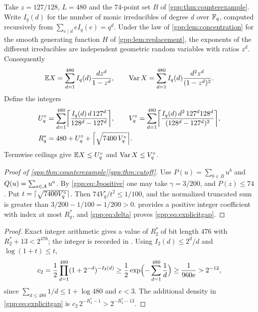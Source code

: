 Take $z=127/128$, $L=480$ and the $74$-point set $B$ of \cref{gpp:thm:counterexample}.
Write $I_q(d)$ for the number of monic irreducibles of degree $d$ over $\mathbb{F}_q$, computed
recursively from $\sum_{e\mid d}eI_q(e)=q^d$. Under the law of
\cref{gpp:lem:concentration} for the smooth generating function $H$ of
\cref{gpp:lem:replacement}, the exponents of the different irreducibles are independent
geometric random variables with ratios $z^d$. Consequently
\[
 \mathbb{E} X=\sum_{d=1}^{480}I_q(d)\frac{dz^d}{1-z^d},\qquad
 \operatorname{Var} X=\sum_{d=1}^{480}I_q(d)\frac{d^2z^d}{(1-z^d)^2}.
\]
Define the integers
\begin{align}
 U_q^{\circ}&=\sum_{d=1}^{480}\ceil*{\frac{I_q(d)\,d\,127^d}{128^d-127^d}},\qquad
 V_q^{\circ}=\sum_{d=1}^{480}\ceil*{\frac{I_q(d)\,d^2\,127^d128^d}{(128^d-127^d)^2}},
 \notag\\
 R_q^*&=480+U_q^{\circ}+\ceil*{\sqrt{7400\,V_q^{\circ}}}. \label{gpp:eq:Rstar}
\end{align}
Termwise ceilings give $\mathbb{E} X\le U_q^{\circ}$ and $\operatorname{Var} X\le V_q^{\circ}$.

\begin{proof}[Proof of \cref{gpp:thm:counterexample}\ref{gpp:thm:cutoff}]
Use $P(u)=\sum_{b\in B}u^b$ and $Q(u)=\sum_{a\in\mathcal{A}}u^a$. By
\eqref{gpp:eq:Jpositive} one may take $\gamma=3/200$, and $P(z)\le74$. Put
$t=\lceil\sqrt{7400V_q^{\circ}}\rceil$. Then $74V_q^{\circ}/t^2\le1/100$, and the normalized
truncated sum is greater than $3/200-1/100=1/200>0$.  provides
a positive integer coefficient with index at most $R_q^*$, and \eqref{gpp:eq:delta}
proves \eqref{gpp:eq:explicitgap}.
\end{proof}


\begin{proof}
Exact integer arithmetic gives a value of $R_2^*$ of bit length $476$ with
$R_2^*+13<2^{476}$; the integer is recorded in
. Using
$I_2(d)\le2^d/d$ and $\log(1+t)\le t$,
\[
 c_2=\frac12\prod_{d=1}^{480}(1+2^{-d})^{-I_2(d)}
 \ge\frac12\exp\Bigl(-\sum_{d=1}^{480}\frac1d\Bigr)\ge\frac1{960e}>2^{-12},
\]
since $\sum_{d\le480}1/d\le1+\log480$ and $e<3$. The additional density in
\eqref{gpp:eq:explicitgap} is $c_2\,2^{-R_2^*-1}>2^{-R_2^*-13}$.
\end{proof}

